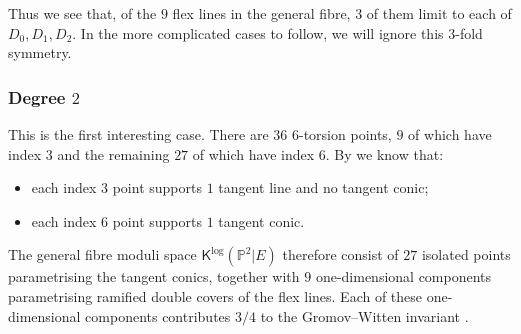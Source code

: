 \documentclass[11pt]{amsart}
\theoremstyle{definition}
\theoremstyle{definition}
\newcommand{\PP}{\mathbb{P}}
\newcommand{\Kup}{\mathsf{K}}
\begin{document}
Thus we see that, of the $9$ flex lines in the general fibre, $3$ of them limit to each of $D_0,D_1,D_2$. In the more complicated cases to follow, we will ignore this $3$-fold symmetry.

\subsubsection{Degree $2$}\label{sec: degree 2 degenerations} \label{sec: deg 2 degeneration} This is the first interesting case. There are $36$ $6$-torsion points, $9$ of which have index $3$ and the remaining $27$ of which have index $6$. By \cite[Proposition 1.4]{TakahashiCurvesComplement} we know that:
\begin{itemize}
\item each index $3$ point supports $1$ tangent line and no tangent conic;
\item each index $6$ point supports $1$ tangent conic.	
\end{itemize}
The general fibre moduli space $\Kup^{\log}(\PP^2|E)$ therefore consist of $27$ isolated points parametrising the tangent conics, together with $9$ one-dimensional components parametrising ramified double covers of the flex lines. Each of these one-dimensional components contributes $3/4$ to the Gromov--Witten invariant \cite[Proposition 6.1]{GPS}.
\end{document}
